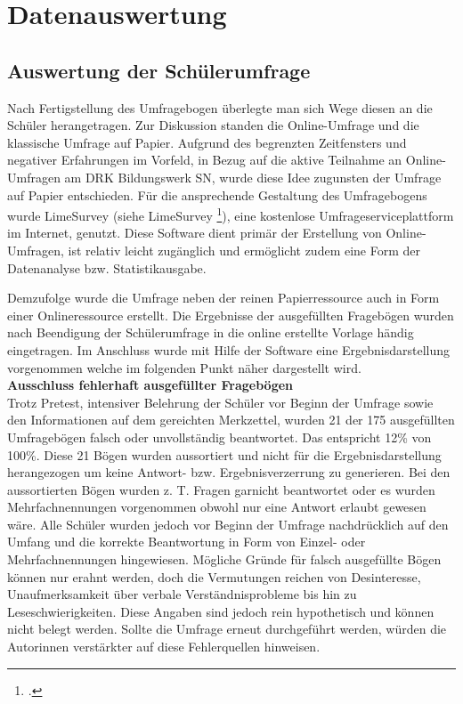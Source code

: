 \section{Datenauswertung}
\label{sec:Datenauswertung}

\subsection{Auswertung der Schülerumfrage}
\label{sec:AuswertungDerSchülerumfrage}

Nach Fertigstellung des Umfragebogen überlegte man sich Wege diesen an die Schüler herangetragen. Zur Diskussion standen die Online-Umfrage und die klassische Umfrage auf Papier. Aufgrund des begrenzten Zeitfensters und negativer Erfahrungen im Vorfeld, in Bezug auf die aktive Teilnahme an Online-Umfragen am DRK Bildungswerk SN, wurde diese Idee zugunsten der Umfrage auf Papier entschieden. Für die ansprechende Gestaltung des Umfragebogens wurde LimeSurvey (siehe LimeSurvey \footcite {LimeSurvey2015}), eine kostenlose Umfrageserviceplattform im Internet, genutzt. Diese Software dient primär der Erstellung von Online-Umfragen, ist relativ leicht zugänglich und ermöglicht zudem eine Form der Datenanalyse bzw. Statistikausgabe.

Demzufolge wurde die Umfrage neben der reinen Papierressource auch in Form einer Onlineressource erstellt. Die Ergebnisse der ausgefüllten Fragebögen wurden nach Beendigung der Schülerumfrage in die online erstellte Vorlage händig eingetragen. Im Anschluss wurde mit Hilfe der Software eine Ergebnisdarstellung vorgenommen welche im folgenden Punkt näher dargestellt wird.\\

\noindent
\textbf{Ausschluss fehlerhaft ausgefüllter Fragebögen}\\

Trotz Pretest, intensiver Belehrung der Schüler vor Beginn der Umfrage sowie den Informationen auf dem gereichten Merkzettel, wurden 21 der 175 ausgefüllten Umfragebögen falsch oder unvollständig beantwortet. Das entspricht 12\% von 100\%. Diese 21 Bögen wurden aussortiert und nicht für die Ergebnisdarstellung herangezogen um keine Antwort- bzw. Ergebnisverzerrung zu generieren. Bei den aussortierten Bögen wurden z. T. Fragen garnicht beantwortet oder es wurden Mehrfachnennungen vorgenommen obwohl nur eine Antwort erlaubt gewesen wäre. Alle Schüler wurden jedoch vor Beginn der Umfrage nachdrücklich auf den Umfang und die korrekte Beantwortung in Form von Einzel- oder Mehrfachnennungen hingewiesen. Mögliche Gründe für falsch ausgefüllte Bögen können nur erahnt werden, doch die Vermutungen reichen von Desinteresse, Unaufmerksamkeit über verbale Verständnisprobleme bis hin zu Leseschwierigkeiten. Diese Angaben sind jedoch rein hypothetisch und können nicht belegt werden. Sollte die Umfrage erneut durchgeführt werden, würden die Autorinnen verstärkter auf diese Fehlerquellen hinweisen. 


